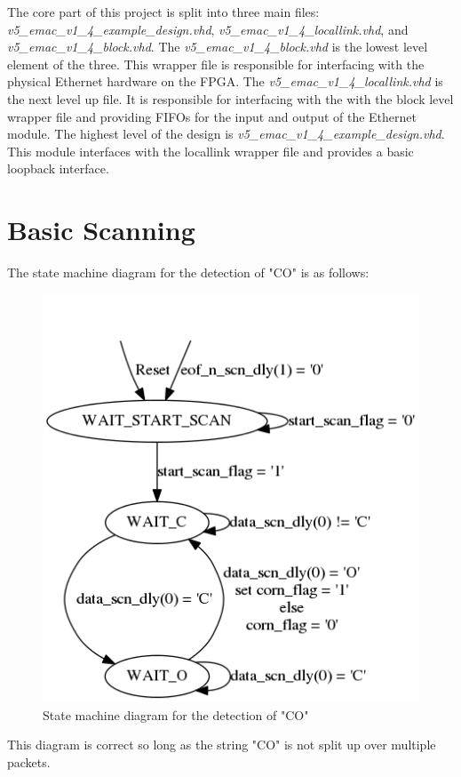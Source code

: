 \documentclass{article}
\begin{document}
The core part of this project is split into three main files: \textit{v5\_emac\_v1\_4\_example\_design.vhd}, \textit{v5\_emac\_v1\_4\_locallink.vhd}, and \textit{v5\_emac\_v1\_4\_block.vhd}. The \textit{v5\_emac\_v1\_4\_block.vhd} is the lowest level element of the three. This wrapper file is responsible for interfacing with the physical Ethernet hardware on the FPGA. The \textit{v5\_emac\_v1\_4\_locallink.vhd} is the next level up file. It is responsible for interfacing with the with the block level wrapper file and providing FIFOs for the input and output of the Ethernet module. The highest level of the design is \textit{v5\_emac\_v1\_4\_example\_design.vhd}. This module interfaces with the locallink wrapper file and provides a basic loopback interface.



\section{Basic Scanning}
The state machine diagram for the detection of "CO" is as follows:
	\begin{figure}[h]
		\begin{center}
			\includegraphics[scale=0.45]{../graphviz/part_2_state_diagram.png}
			\caption{State machine diagram for the detection of "CO"}
		\end{center}
	\end{figure}
This diagram is correct so long as the string "CO" is not split up over multiple packets.\\
\end{document}
